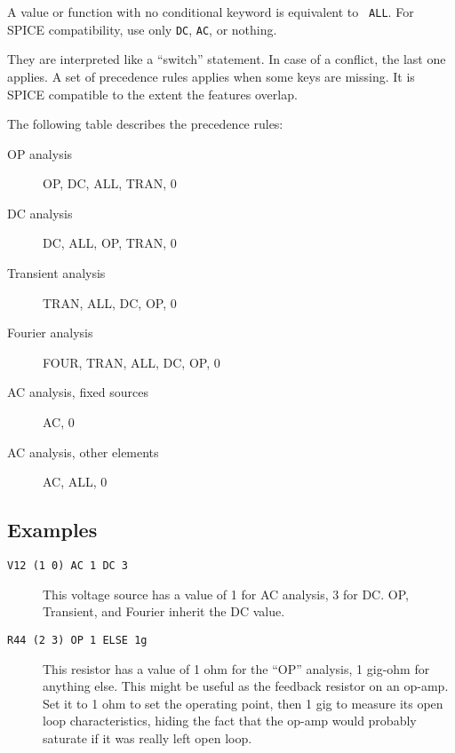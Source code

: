 A value or function with no conditional keyword is equivalent to {\tt
ALL}.  For SPICE compatibility, use only {\tt DC}, {\tt AC}, or nothing.

They are interpreted like a ``switch'' statement.  In case of a
conflict, the last one applies.  A set of precedence rules applies
when some keys are missing.  It is SPICE compatible to the extent the
features overlap.

The following table describes the precedence rules:

\begin{description}

\item[{OP analysis}] OP, DC, ALL, TRAN, 0
\item[{DC analysis}] DC, ALL, OP, TRAN, 0
\item[{Transient analysis}] TRAN, ALL, DC, OP, 0
\item[{Fourier analysis}] FOUR, TRAN, ALL, DC, OP, 0
\item[{AC analysis, fixed sources}] AC, 0
\item[{AC analysis, other elements}] AC, ALL, 0

\end{description}
\subsection{Examples}

\begin{description}

\item[{\tt V12 (1 0) AC 1 DC 3}] This voltage source has a value of 1
for AC analysis, 3 for DC.  OP, Transient, and Fourier inherit the DC value.

\item[{\tt R44 (2 3) OP 1 ELSE 1g}] This resistor has a value of 1 ohm
for the ``OP'' analysis, 1 gig-ohm for anything else.  This might be
useful as the feedback resistor on an op-amp.  Set it to 1 ohm to set
the operating point, then 1 gig to measure its open loop
characteristics, hiding the fact that the op-amp would probably
saturate if it was really left open loop.

\end{description}
